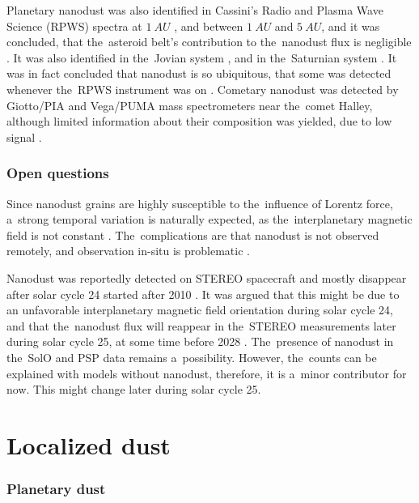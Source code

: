 Planetary nanodust was also identified in Cassini's Radio and Plasma Wave Science ({RPWS}) spectra 
at $\SI{1}{AU}$ \citep{schippers2014nanodust}, and between $\SI{1}{AU}$ and $\SI{5}{AU}$, and it was concluded, that the~asteroid belt's contribution to the~nanodust flux is negligible \citep{schippers2015nanodust}. It was also identified in the~Jovian system \citep{meyer2009detecting}, and in the~Saturnian system \citep{kempf2005high}. It was in fact concluded that nanodust is so ubiquitous, that some was detected whenever the~RPWS instrument was on \citep{schippers2015nanodust}. Cometary nanodust was detected by Giotto/PIA and Vega/PUMA mass spectrometers near the~comet Halley, although limited information about their composition was yielded, due to low signal \citep{utterback1990attogram}.

\subsubsection{Open questions}

Since nanodust grains are highly susceptible to the~influence of Lorentz force, a~strong temporal variation is naturally expected, as the~interplanetary magnetic field is not constant \citep{poppe2020effects}. The~complications are that nanodust is not observed remotely, and observation in-situ is problematic \citep{pantellini2012nano,kellogg2016dust,kellogg2017note}. 

Nanodust was reportedly detected on STEREO spacecraft \citep{meyer2009dust} and mostly disappear after solar cycle 24 started after 2010 \citep{zaslavsky2012interplanetary}. It was argued that this might be due to an unfavorable interplanetary magnetic field orientation during solar cycle 24, and that the~nanodust flux will reappear in the~STEREO measurements later during solar cycle 25, at some time before 2028 \citep{poppe2022effects}. The~presence of nanodust in the~SolO and PSP data remains a~possibility. However, the~counts can be explained with models without nanodust, therefore, it is a~minor contributor for now. This might change later during solar cycle 25. 

\section{Localized dust}

\subsubsection{Planetary dust}

